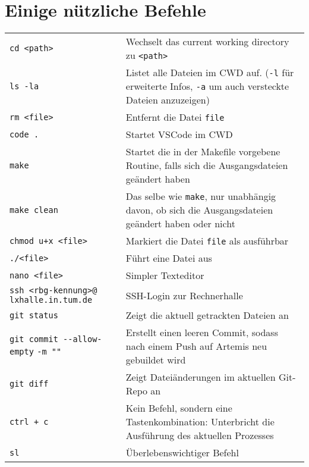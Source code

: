 \documentclass{article}
\begin{document}
\section{Einige nützliche Befehle}
    \begin{longtable}{p{4cm}p{12cm}}
        \verb|cd <path>| & Wechselt das current working directory zu \verb|<path>| \\ 
        \verb|ls -la| & Listet alle Dateien im CWD auf. (\verb|-l| für erweiterte Infos, \verb|-a| um auch versteckte Dateien anzuzeigen) \\  
        \verb|rm <file>|& Entfernt die Datei \verb|file|\\
        \verb|code .| & Startet VSCode im CWD\\
        \verb|make| & Startet die in der Makefile vorgebene Routine, falls sich die Ausgangsdateien geändert haben\\
        \verb|make clean| & Das selbe wie \verb|make|, nur unabhängig davon, ob sich die Ausgangsdateien geändert haben oder nicht\\
        \verb|chmod u+x <file>| & Markiert die Datei \verb|file| als ausführbar\\
        \verb|./<file>| & Führt eine Datei aus\\
        \verb|nano <file>| & Simpler Texteditor\\
        \verb|ssh <rbg-kennung>@| \verb|lxhalle.in.tum.de| & SSH-Login zur Rechnerhalle\\
        \verb|git status| & Zeigt die aktuell getrackten Dateien an\\
        \verb|git commit --allow-| \verb|empty| \verb|-m ""| & Erstellt einen leeren Commit, sodass nach einem Push auf Artemis neu gebuildet wird\\
        \verb|git diff| & Zeigt Dateiänderungen im aktuellen Git-Repo an\\
        \verb|ctrl + c| & Kein Befehl, sondern eine Tastenkombination: Unterbricht die Ausführung des aktuellen Prozesses\\
        \verb|sl| & Überlebenswichtiger Befehl\\
    \end{longtable}
\end{document}
